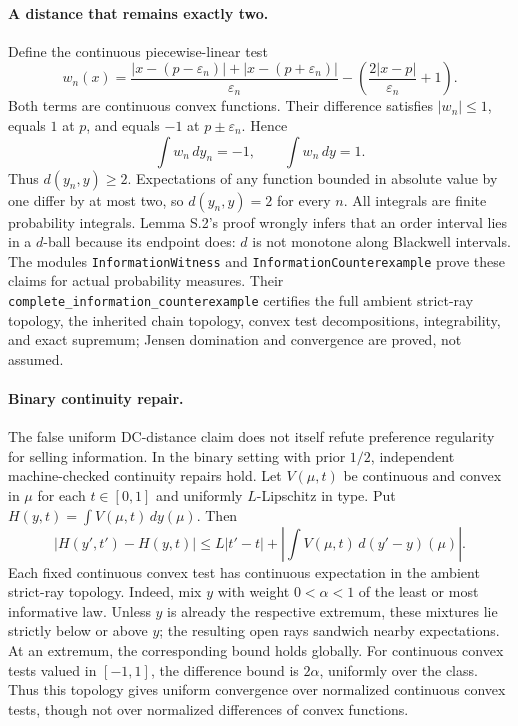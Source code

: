 \documentclass[11pt]{article}
\theoremstyle{remark}\newtheorem{remark}[theorem]{Remark}
\begin{document}
\paragraph{A distance that remains exactly two.}
Define the continuous piecewise-linear test
\[
 w_n(x)=
 \frac{|x-(p-\varepsilon_n)|+|x-(p+\varepsilon_n)|}
      {\varepsilon_n}
 -\left(\frac{2|x-p|}{\varepsilon_n}+1\right).
\]
Both terms are continuous convex functions.  Their difference satisfies
$|w_n|\le1$, equals $1$ at $p$, and equals $-1$ at $p\pm\varepsilon_n$.
Hence
\[
 \int w_n\,dy_n=-1,\qquad \int w_n\,dy=1.
\]
Thus $d(y_n,y)\ge2$.  Expectations of any function bounded in absolute
value by one differ by at most two, so $d(y_n,y)=2$ for every $n$.
All integrals are finite probability integrals.
Lemma S.2's proof wrongly infers that an order interval lies in a
$d$-ball because its endpoint does: $d$ is not monotone along Blackwell
intervals.  The modules \texttt{InformationWitness} and
\texttt{InformationCounterexample} prove these claims for actual
probability measures.  Their
\texttt{complete\_\allowbreak information\_\allowbreak counterexample} certifies the full ambient
strict-ray topology, the inherited chain topology, convex test
decompositions, integrability, and exact supremum; Jensen domination
and convergence are proved, not assumed.

\paragraph{Binary continuity repair.}
The false uniform DC-distance claim does not itself refute preference
regularity for selling information.  In the binary setting with prior
$1/2$, independent machine-checked continuity repairs hold.
Let $V(\mu,t)$ be continuous and convex in $\mu$ for each $t\in[0,1]$
and uniformly $L$-Lipschitz in type.  Put
$H(y,t)=\int V(\mu,t)\,dy(\mu)$.  Then
\[
 |H(y',t')-H(y,t)|
 \le L|t'-t|
   +\left|\int V(\mu,t)\,d(y'-y)(\mu)\right|.
\]
Each fixed continuous convex test has continuous expectation in the
ambient strict-ray topology.  Indeed, mix $y$ with weight $0<\alpha<1$
of the least or most informative law.  Unless $y$ is already the
respective extremum, these mixtures lie strictly below or above $y$;
the resulting open rays sandwich nearby expectations.  At an extremum,
the corresponding bound holds globally.  For continuous convex tests valued in
$[-1,1]$, the difference bound is $2\alpha$, uniformly over the class.
Thus this topology gives uniform convergence over normalized continuous
convex tests, though not over normalized differences of convex functions.
\end{document}
